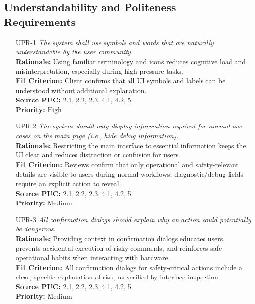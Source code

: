 \documentclass[12pt]{article}
\begin{document}
\subsection{Understandability and Politeness Requirements}
\begin{itemize}[leftmargin=*]
  \item[UPR-1] \emph{The system shall use symbols and words that are naturally
          understandable by the user community.}\\[2mm]
        \textbf{Rationale:} Using familiar terminology and icons reduces cognitive load and misinterpretation, especially during high-pressure tasks.\\
        \textbf{Fit Criterion:} Client confirms that all UI symbols and labels can be understood without additional explanation.\\
        \textbf{Source PUC:} 2.1, 2.2, 2.3, 4.1, 4.2, 5 \\
        \textbf{Priority:} High
  \item[UPR-2] \emph{The system should only display information required for normal use
          cases on the main page (i.e., hide debug information).}\\[2mm]
        \textbf{Rationale:} Restricting the main interface to essential information keeps the UI clear and reduces distraction or confusion for users.\\
        \textbf{Fit Criterion:} Reviews confirm that only operational and safety-relevant details are visible to users during normal workflows; diagnostic/debug fields require an explicit action to reveal.\\
        \textbf{Source PUC:} 2.1, 2.2, 2.3, 4.1, 4.2, 5 \\
        \textbf{Priority:} Medium

  \item[UPR-3] \emph{All confirmation dialogs should explain why an action could
          potentially be dangerous.}\\[2mm]
        \textbf{Rationale:} Providing context in confirmation dialogs educates users, prevents accidental execution of risky commands, and reinforces safe operational habits when interacting with hardware.\\
        \textbf{Fit Criterion:} All confirmation dialogs for safety-critical actions include a clear, specific explanation of risk, as verified by interface inspection.\\
        \textbf{Source PUC:} 2.1, 2.2, 2.3, 4.1, 4.2, 5 \\
        \textbf{Priority:} Medium
\end{itemize}
\end{document}
